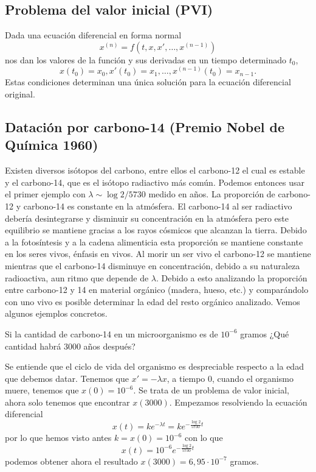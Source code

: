 \documentclass[../main.tex]{subfiles}
\begin{document}
\subsection{Problema del valor inicial (PVI)}

Dada una ecuación diferencial en forma normal
\[x^{(n)} = f(t, x, x', \dots, x^{(n - 1)})\]
nos dan los valores de la función y sus derivadas en un tiempo determinado
\(t_0\),
\[x(t_0) = x_0, x'(t_0) = x_1, \dots, x^{(n - 1)}(t_0) = x_{n - 1}.\]
Estas condiciones determinan una única solución para la ecuación diferencial
original.

\subsection{Datación por carbono-14 (Premio Nobel de Química 1960)}

Existen diversos isótopos del carbono, entre ellos el carbono-12 el cual es
estable y el carbono-14, que es el isótopo radiactivo más común. Podemos
entonces usar el primer ejemplo con \(\lambda \sim \log 2 / 5730\) medido en
años. La proporción de carbono-12 y carbono-14 es constante en la atmósfera. El
carbono-14 al ser radiactivo debería desintegrarse y disminuir su concentración
en la atmósfera pero este equilibrio se mantiene gracias a los rayos cósmicos
que alcanzan la tierra. Debido a la fotosíntesis y a la cadena alimenticia esta
proporción se mantiene constante en los seres vivos, énfasis en vivos. Al morir
un ser vivo el carbono-12 se mantiene mientras que el carbono-14 disminuye en
concentración, debido a su naturaleza radioactiva, aun ritmo que depende de
\(\lambda\). Debido a esto analizando la proporción entre carbono-12 y 14 en
material orgánico (madera, hueso, etc.) y comparándolo con uno vivo es posible
determinar la edad del resto orgánico analizado. Vemos algunos ejemplos
concretos.

\begin{example}
	Si la cantidad de carbono-14 en un microorganismo es de \(10^{-6}\) gramos
	¿Qué cantidad habrá 3000 años después?
\end{example}

\begin{solution}
	Se entiende que el ciclo de vida del organismo
	es despreciable respecto a la edad que debemos datar. Tenemos que
	\(x' = -\lambda x\), a tiempo \(0\), cuando el organismo muere, tenemos que
	\(x(0) = 10^{-6}\). Se trata de un problema de valor inicial, ahora solo tenemos
	que encontrar \(x(3000)\). Empezamos resolviendo la ecuación diferencial
	\[x(t) = k e^{-\lambda t} = k e^{-\frac{\log 2}{5730} t}\]
	por lo que hemos visto antes \(k = x(0) = 10^{-6}\) con lo que
	\[x(t) = 10^{-6} e^{-\frac{\log 2}{5730} t}\]
	podemos obtener ahora el resultado \(x(3000) = 6,95 \cdot 10^{-7}\) gramos.
\end{solution}
\end{document}

